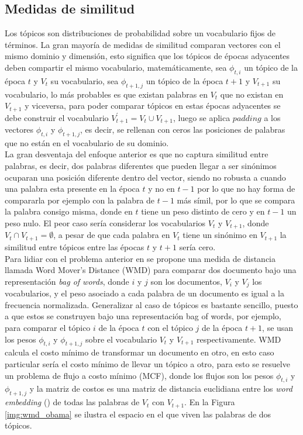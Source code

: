 \documentclass[letterpaper,12pt,oneside]{book} %
\begin{document}
\subsection{Medidas de similitud}
Los tópicos son distribuciones de probabilidad sobre un vocabulario fijos de términos. La gran mayoría de medidas de similitud comparan vectores con el mismo dominio y dimensión, esto significa que los tópicos de épocas adyacentes deben compartir el mismo vocabulario, matemáticamente, sea $\phi_{t, i}$ un tópico de la época $t$ y $V_{t}$ su vocabulario, sea  $\phi_{t+1, j}$ un tópico de la época $t+1$ y $V_{t+1}$ su vocabulario, lo más probables es que existan palabras en $V_{t}$ que no existan en $V_{t+1}$ y viceversa, para poder comparar tópicos en estas épocas adyacentes se debe construir el vocabulario $V_{t+1}^{'}=V_{t}\cup V_{t+1}$, luego se aplica $padding$ a los vectores $\phi_{t, i}$ y $\phi_{t+1, j}$, es decir, se rellenan con ceros las posiciones de palabras que no están en el vocabulario de su dominio.\\

La gran desventaja del enfoque anterior es que no captura similitud entre palabras, es decir, dos palabras diferentes que pueden llegar a ser sinónimos ocuparan una posición diferente dentro del vector, siendo no robusta a cuando una palabra esta presente en la época $t$ y no en $t-1$ por lo que no hay forma de compararla por ejemplo con la palabra de $t-1$ más símil, por lo que se compara la palabra consigo misma, donde en $t$ tiene un peso distinto de cero y en $t-1$ un peso nulo. El peor caso sería considerar los vocabularios $V_{t}$ y $V_{t+1}$, donde $V_{t}\cap V_{t+1} =  \emptyset$, a pesar de que cada palabra en $V_{t}$ tiene un sinónimo en $V_{t+1}$ la similitud entre tópicos entre las épocas $t$ y $t+1$ sería cero.\\

Para lidiar con el problema anterior en \citep{kusner2015word} se propone una medida de distancia llamada Word Mover's Distance (WMD) para comparar dos documento bajo una representación \textit{bag of words}, donde $i$ y $j$ son los documentos, $V_{i}$ y $V_{j}$ los vocabularios, y el peso asociado a cada palabra de un documento  es igual a la frecuencia normalizada. Generalizar al caso de tópicos es bastante sencillo, puesto a que estos se construyen bajo una representación bag of words, por ejemplo, para comparar el tópico $i$ de la época $t$ con el tópico $j$ de la época $t+1$, se usan los pesos $\phi_{t,i}$ y $\phi_{t+1,j}$ sobre el vocabulario $V_{t}$ y $V_{t+1}$ respectivamente. WMD calcula el costo mínimo de transformar un documento en otro, en esto caso particular sería el costo mínimo de llevar un tópico a otro, para esto se resuelve un problema de flujo a costo mínimo (MCF), donde los flujos son los pesos $\phi_{t,i}$ y $\phi_{t+1,j}$ y la matriz de costos es una matriz de distancia euclidiana entre los \textit{word embedding} (\cite{mikolov2013distributed}) de todas las palabras de $V_{t}$ con $V_{t+1}$. En la Figura \ref{img:wmd_obama} se ilustra el espacio en el que viven las palabras de dos tópicos.
\end{document}
